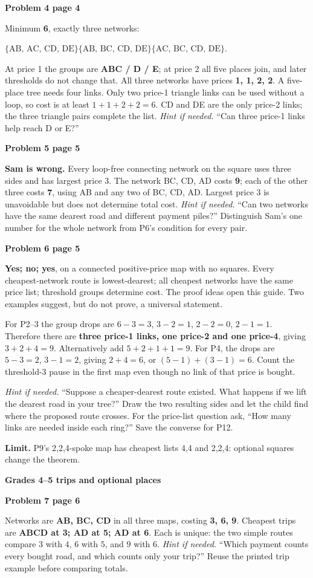 \documentclass[11pt]{article}
\newcommand{\head}[1]{\par{\large\bfseries #1}\par}
\newcommand{\sub}[1]{\par\textbf{#1}\par}
\newcommand{\hint}[1]{\textit{Hint if needed.} #1}
\newcommand{\links}[1]{\ensuremath{\{\text{#1}\}}}
\begin{document}
\sub{Problem 4 page 4}
Minimum \textbf{6}, exactly three networks:
\begin{center}
\links{AB, AC, CD, DE}\qquad\links{AB, BC, CD, DE}\qquad\links{AC, BC, CD, DE}.
\end{center}
At price 1 the groups are \textbf{ABC / D / E}; at price 2 all five places join, and later thresholds do not change that. All three networks have prices \textbf{1, 1, 2, 2}. A five-place tree needs four links. Only two price-1 triangle links can be used without a loop, so cost is at least $1+1+2+2=6$. CD and DE are the only price-2 links; the three triangle pairs complete the list. \hint{``Can three price-1 links help reach D or E?''}

\sub{Problem 5 page 5}
\textbf{Sam is wrong.} Every loop-free connecting network on the square uses three sides and has largest price 3. The network BC, CD, AD costs \textbf{9}; each of the other three costs \textbf{7}, using AB and any two of BC, CD, AD. Largest price 3 is unavoidable but does not determine total cost. \hint{``Can two networks have the same dearest road and different payment piles?''} Distinguish Sam's one number for the whole network from P6's condition for every pair.

\sub{Problem 6 page 5}
\textbf{Yes; no; yes}, on a connected positive-price map with no squares. Every cheapest-network route is lowest-dearest; all cheapest networks have the same price list; threshold groups determine cost. The proof ideas open this guide. Two examples suggest, but do not prove, a universal statement.

For P2--3 the group drops are $6-3=3$, $3-2=1$, $2-2=0$, $2-1=1$. Therefore there are \textbf{three price-1 links, one price-2 and one price-4}, giving $3+2+4=9$. Alternatively add $5+2+1+1=9$. For P4, the drops are $5-3=2$, $3-1=2$, giving $2+4=6$, or $(5-1)+(3-1)=6$. Count the threshold-3 pause in the first map even though no link of that price is bought.

\hint{``Suppose a cheaper-dearest route existed. What happens if we lift the dearest road in your tree?''} Draw the two resulting sides and let the child find where the proposed route crosses. For the price-list question ask, ``How many links are needed inside each ring?'' Save the converse for P12.

\textbf{Limit.} P9's 2,2,4-spoke map has cheapest lists 4,4 and 2,2,4: optional squares change the theorem.
\newpage
\head{Grades 4--5 trips and optional places}
\sub{Problem 7 page 6}
Networks are \textbf{AB, BC, CD} in all three maps, costing \textbf{3, 6, 9}. Cheapest trips are \textbf{ABCD at 3; AD at 5; AD at 6}. Each is unique: the two simple routes compare $3$ with $4$, $6$ with $5$, and $9$ with $6$. \hint{``Which payment counts every bought road, and which counts only your trip?''} Reuse the printed trip example before comparing totals.
\end{document}
